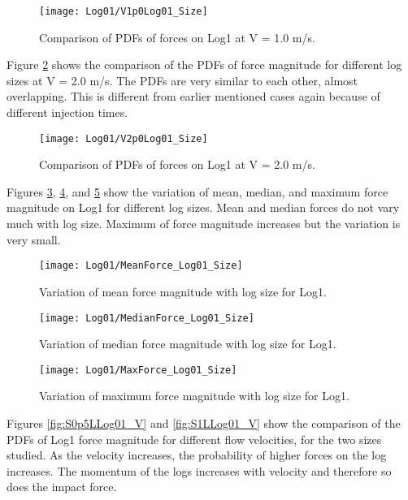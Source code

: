 \begin{figure}
\centering
\texttt{[image: Log01/V1p0Log01\_Size]}
\caption{\label{fig:V1p0Log01_Size}Comparison of PDFs of forces on Log1 at V = 1.0 m/s.}
\end{figure}

\noindent Figure \ref{fig:V2p0Log01_Size} shows the comparison of the PDFs of force magnitude for different log sizes at V = 2.0 m/s. The PDFs are very similar to each other, almost overlapping. This is different from earlier mentioned cases again because of different injection times. %

\begin{figure}
\centering
\texttt{[image: Log01/V2p0Log01\_Size]}
\caption{\label{fig:V2p0Log01_Size}Comparison of PDFs of forces on Log1 at V = 2.0 m/s.}
\end{figure}

\noindent Figures \ref{fig:MeanForce_Log01_Size}, \ref{fig:MedianForce_Log01_Size}, and \ref{fig:MaxForce_Log01_Size} show the variation of mean, median, and maximum force magnitude on Log1 for different log sizes. Mean and median forces do not vary much with log size. Maximum of force magnitude increases but the variation is very small. 

\begin{figure}
\centering
\texttt{[image: Log01/MeanForce\_Log01\_Size]}
\caption{\label{fig:MeanForce_Log01_Size}Variation of mean force magnitude with log size for Log1.}
\end{figure}
\begin{figure}
\centering
\texttt{[image: Log01/MedianForce\_Log01\_Size]}
\caption{\label{fig:MedianForce_Log01_Size}Variation of median force magnitude with log size for Log1.}
\end{figure}
\begin{figure}
\centering
\texttt{[image: Log01/MaxForce\_Log01\_Size]}
\caption{\label{fig:MaxForce_Log01_Size}Variation of maximum force magnitude with log size for Log1.}
\end{figure}

\noindent Figures \ref{fig:S0p5LLog01_V} and \ref{fig:S1LLog01_V} show the comparison of the PDFs of Log1 force magnitude for different flow velocities, for the two sizes studied. As the velocity increases, the probability of higher forces on the log increases. The momentum of the logs increases with velocity and therefore so does the impact force.

